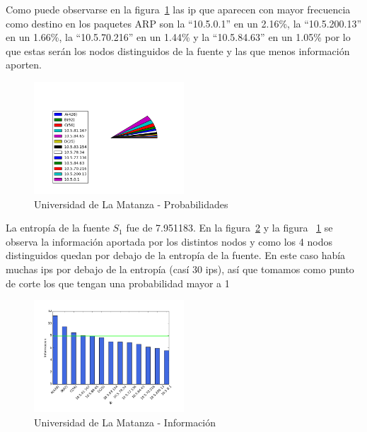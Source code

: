 \documentclass[final,inline,narroweqnarray,a4paper]{ieee}
\begin{document}
Como puede observarse en la figura~\ref{torta:universidadLMS1} las ip que aparecen con mayor frecuencia como destino en los paquetes ARP son la ``10.5.0.1'' en un 2.16\%, la ``10.5.200.13'' en un 1.66\%, la ``10.5.70.216'' en un 1.44\% y la ``10.5.84.63'' en un 1.05\% por lo que estas serán los nodos distinguidos de la fuente y las que menos información aporten.

\begin{figure}[H]
    \begin{center}
        \includegraphics[width=0.5\textwidth]{plot/facultadS1_v3-pie.png}
        \caption{Universidad de La Matanza - Probabilidades}
        \label{torta:universidadLMS1}
    \end{center}
\end{figure} 

La entropía de la fuente $S_1$ fue de 7.951183. En la figura~\ref{histo:universidadLMS1} y la figura ~\ref{torta:universidadLMS1} se observa la información aportada por los distintos nodos y como los 4 nodos distinguidos quedan por debajo de la entropía de la fuente. En este caso había muchas ips por debajo de la entropía (casí 30 ips), así que tomamos como punto de corte los que tengan una probabilidad mayor a 1%

\begin{figure}[H]
    \begin{center}
        \includegraphics[width=0.5\textwidth]{plot/facultadS1_v3-bar.png}
        \caption{Universidad de La Matanza - Información}
        \label{histo:universidadLMS1}
    \end{center}
\end{figure}
\end{document}
